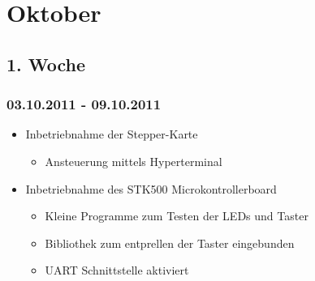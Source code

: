 \documentclass[ngerman]{beamer}
\begin{document}
\titlepage



\section{Oktober}
\subsection{1. Woche}
\begin{frame}\frametitle{03.10.2011 - 09.10.2011}
\begin{itemize}
	\item Inbetriebnahme der Stepper-Karte 
	\begin{itemize}
		\item Ansteuerung mittels Hyperterminal 
	\end{itemize}
	
	\item Inbetriebnahme des STK500 Microkontrollerboard 
	\begin{itemize}
		\item Kleine Programme zum Testen der LEDs und Taster 
		\item Bibliothek zum entprellen der Taster eingebunden 
		\item UART Schnittstelle aktiviert
	\end{itemize}
\end{itemize}
\end{frame}
\end{document}
